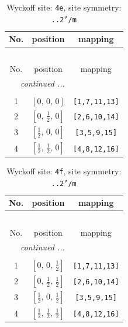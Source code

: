 \documentclass[fleqn,8pt]{jsarticle}
\begin{document}
\begin{longtable}{ccc}
\caption{Wyckoff site: {\tt 4e}, site symmetry: {\tt ..2'/m}}
 \\
 \hline \hline
No. & position & mapping \\ \hline \endfirsthead

\multicolumn{2}{l}{\tablename\ \thetable{}} \\
 \hline \hline
No. & position & mapping \\ \hline \endhead

 \hline \hline
\multicolumn{2}{r}{\footnotesize\it continued ...} \\ \endfoot

 \hline \hline
\multicolumn{2}{r}{} \\ \endlastfoot

1 & $\left[ 0,\, 0,\, 0 \right]$ & {\tt [1,7,11,13]} \\ \hline
2 & $\left[ 0,\, \frac{1}{2},\, 0 \right]$ & {\tt [2,6,10,14]} \\ \hline
3 & $\left[ \frac{1}{2},\, 0,\, 0 \right]$ & {\tt [3,5,9,15]} \\ \hline
4 & $\left[ \frac{1}{2},\, \frac{1}{2},\, 0 \right]$ & {\tt [4,8,12,16]} \\
\end{longtable}
\renewcommand{\arraystretch}{1.2}
\begin{longtable}{ccc}
\caption{Wyckoff site: {\tt 4f}, site symmetry: {\tt ..2'/m}}
 \\
 \hline \hline
No. & position & mapping \\ \hline \endfirsthead

\multicolumn{2}{l}{\tablename\ \thetable{}} \\
 \hline \hline
No. & position & mapping \\ \hline \endhead

 \hline \hline
\multicolumn{2}{r}{\footnotesize\it continued ...} \\ \endfoot

 \hline \hline
\multicolumn{2}{r}{} \\ \endlastfoot

1 & $\left[ 0,\, 0,\, \frac{1}{2} \right]$ & {\tt [1,7,11,13]} \\ \hline
2 & $\left[ 0,\, \frac{1}{2},\, \frac{1}{2} \right]$ & {\tt [2,6,10,14]} \\ \hline
3 & $\left[ \frac{1}{2},\, 0,\, \frac{1}{2} \right]$ & {\tt [3,5,9,15]} \\ \hline
4 & $\left[ \frac{1}{2},\, \frac{1}{2},\, \frac{1}{2} \right]$ & {\tt [4,8,12,16]} \\
\end{longtable}
\end{document}
